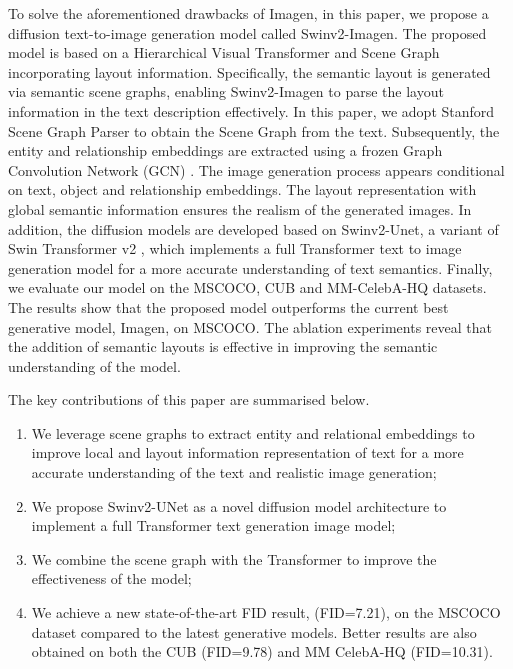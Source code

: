 \documentclass{article}
\begin{document}
To solve the aforementioned drawbacks of Imagen, in this paper, we propose a diffusion text-to-image generation model called Swinv2-Imagen. The proposed model is based on a Hierarchical Visual Transformer and Scene Graph incorporating layout information. Specifically, the semantic layout is generated via semantic scene graphs, enabling Swinv2-Imagen to parse the layout information in the text description effectively. In this paper, we adopt Stanford Scene Graph Parser \cite{Johnson2018ImageGF} to obtain the Scene Graph from the text. Subsequently, the entity and relationship embeddings are extracted using a frozen Graph Convolution Network (GCN) \cite{Johnson2018ImageGF}. The image generation process appears conditional on text, object and relationship embeddings. The layout representation with global semantic information ensures the realism of the generated images. In addition, the diffusion models are developed based on Swinv2-Unet, a variant of Swin Transformer v2 \cite{Liu2022SwinTV}, which implements a full Transformer text to image generation model for a more accurate understanding of text semantics. Finally, we evaluate our model on the MSCOCO, CUB and MM-CelebA-HQ datasets. The results show that the proposed model outperforms the current best generative model, Imagen, on MSCOCO. The ablation experiments reveal that the addition of semantic layouts is effective in improving the semantic understanding of the model.

The key contributions of this paper are summarised below.
\begin{enumerate}
    
    \item We leverage scene graphs to extract entity and relational embeddings to improve local and layout information representation of text for a more accurate understanding of the text and realistic image generation;
    \item We propose Swinv2-UNet as a novel diffusion model architecture to implement a full Transformer text generation image model; 
    \item We combine the scene graph with the Transformer to improve the effectiveness of the model;
    \item We achieve a new state-of-the-art FID result, (FID=7.21), on the MSCOCO dataset compared to the latest generative models. Better results are also obtained on both the CUB (FID=9.78) and MM CelebA-HQ (FID=10.31).

\end{enumerate}
\end{document}
